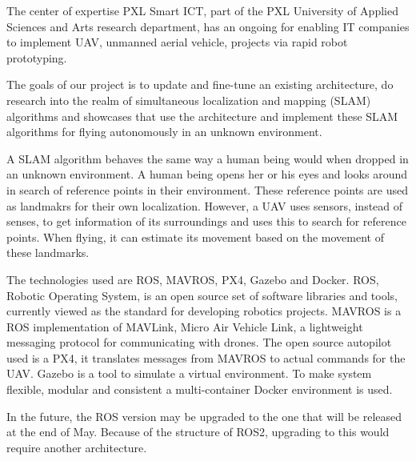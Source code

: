 The center of expertise PXL Smart ICT, part of the PXL University of Applied Sciences and Arts research department, has an ongoing for enabling IT companies to implement UAV, unmanned aerial vehicle, projects via rapid robot prototyping.

The goals of our project is to update and fine-tune an existing architecture, do research into the realm of simultaneous localization and mapping (SLAM) algorithms and showcases that use the architecture and implement these SLAM algorithms for flying autonomously in an unknown environment.

A SLAM algorithm behaves the same way a human being would when dropped in an unknown environment. A human being opens her or his eyes and looks around in search of reference points in their environment. These reference points are used as landmakrs for their own localization. However, a UAV uses sensors, instead of senses, to get information of its surroundings and uses this to search for reference points. When flying, it can estimate its movement based on the movement of these landmarks.

The technologies used are ROS, MAVROS, PX4, Gazebo and Docker. ROS, Robotic Operating System, is an open source set of software libraries and tools, currently viewed as the standard for developing robotics projects. MAVROS is a ROS implementation of MAVLink, Micro Air Vehicle Link, a lightweight messaging protocol for communicating with drones. The open source autopilot used is a PX4, it translates messages from MAVROS to actual commands for the UAV. Gazebo is a tool to simulate a virtual environment. To make system flexible, modular and consistent a multi-container Docker environment is used.

In the future, the ROS version may be upgraded to the one that will be released at the end of May. Because of the structure of ROS2, upgrading to this would require another architecture.

